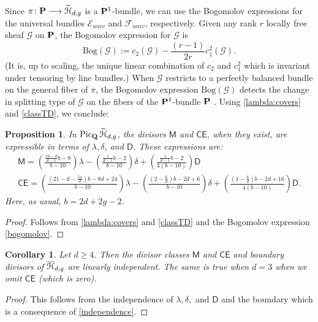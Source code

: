 \documentclass[reqno, 10 pt]{article}
\newtheorem{prop}[thm]{Proposition}
\newtheorem{cor}[thm]{Corollary}
\theoremstyle{definition}
\theoremstyle{remark}
\numberwithin{equation}{section}
\numberwithin{thm}{section}
\numberwithin{prop}{section}
\numberwithin{lem}{section}
\numberwithin{cor}{section}
\numberwithin{conj}{section}
\numberwithin{defn}{section}
\renewcommand{\H}{\mathcal H}
\newcommand{\sfD}{{\mathsf D}}
\newcommand{\sfCE}{{\mathsf {CE}}}
\newcommand{\sfM}{{\mathsf M}}
\newcommand{\cE}{{\mathcal E}}
\newcommand{\cF}{{\mathcal F}}
\newcommand{\cG}{{\mathcal G}}
\newcommand {\Q}{{\bf Q}}
\renewcommand{\P}{{\bf P}}
\renewcommand{\H}{{\mathcal{H}}}
\begin{document}
 Since $\pi \colon \P \longrightarrow \widetilde{\H}_{d,g}$ is a ${\bf P}^1$-bundle, we can use the Bogomolov expressions for the universal bundles $\cE_{univ}$ and $\cF_{univ}$, respectively.  Given any rank $r$ locally free sheaf $\cG$ on $\P$, the Bogomolov expression for $\cG$ is 
\begin{equation}\label{bogomolov}
\text{Bog}(\cG) :=c_2(\cG) -  \frac{(r-1)}{2r}c_1^2(\cG).
\end{equation}
 (It is, up to scaling, the unique linear combination of $c_2$ and $c_1^2$ which is invariant under tensoring by line bundles.) When $\cG$ restricts to a perfectly balanced bundle on the general fiber of $\pi$, the Bogomolov expression $\text{Bog}(\cG)$ detects the change in splitting type of $\cG$ on the fibers of the ${\bf P}^1$-bundle $\P$ \cite{moriwaki98:_relat_bogom}.   Using \autoref{lambda:covers} and \autoref{classTD}, we conclude:

\begin{prop}\label{classofMCE} In ${\rm Pic}_{\Q}\,\widetilde{\H}_{d,g}$, the divisors $\sfM$ and $\sfCE$, when they exist, are expressible in terms of $\lambda, \delta$, and $\sfD$.  These expressions are:
\begin{eqnarray*}
&\sfM = \left(\frac{\frac{10-d}{d-1}b - 8}{b-10}\right)\lambda - \left(\frac{\frac{1}{d-1}b - 2}{b-10}\right)\delta +\left(\frac{\frac{1}{d-1}b-2}{4(b-10)}\right)\sfD &\\
&\sfCE = \left(\frac{(21-d-\frac{54}{d})b-8d+24}{b-10}\right)\lambda - \left(\frac{(2-\frac{6}{d})b - 2d +6}{b-10}\right)\delta + \left(\frac{(1-\frac{6}{d})b - 2d +16}{4(b-10)}\right)\sfD.&
\end{eqnarray*}
Here, as usual, $b = 2d + 2g - 2$.
\end{prop}

\begin{proof} Follows from \autoref{lambda:covers} and \autoref{classTD} and the Bogomolov expression \eqref{bogomolov}.
\end{proof}

\begin{cor}\label{indepMCE}
Let $d \geq 4.$ Then the divisor classes $\sfM$ and $\sfCE$ and boundary divisors of $\o{\H}_{d,g}$ are linearly independent. The same is true when $d=3$ when we omit $\sfCE$ (which is zero).
\end{cor}

\begin{proof}
This follows from the independence of $\lambda, \delta,$ and $\sfD$ and the boundary which is a consequence of \autoref{independence}. 
\end{proof}
\end{document}
